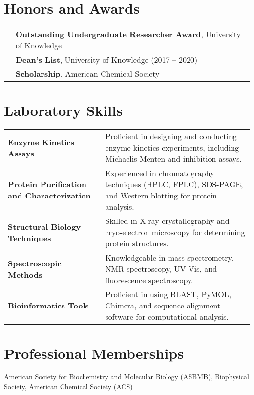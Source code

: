 \documentclass[a4paper,10pt]{article}
\begin{document}
\section*{Honors and Awards}
\begin{tabularx}{\textwidth}{>{\raggedright\arraybackslash}p{1.5cm} X}
2020 & \textbf{Outstanding Undergraduate Researcher Award}, University of Knowledge \\
2019 & \textbf{Dean's List}, University of Knowledge (2017 -- 2020) \\
2018 & \textbf{Scholarship}, American Chemical Society \\
\end{tabularx}

\section*{Laboratory Skills}
\begin{tabularx}{\textwidth}{>{\raggedright\arraybackslash}p{5cm} X}
\textbf{Enzyme Kinetics Assays} & Proficient in designing and conducting enzyme kinetics experiments, including Michaelis-Menten and inhibition assays. \\
\textbf{Protein Purification and Characterization} & Experienced in chromatography techniques (HPLC, FPLC), SDS-PAGE, and Western blotting for protein analysis. \\
\textbf{Structural Biology Techniques} & Skilled in X-ray crystallography and cryo-electron microscopy for determining protein structures. \\
\textbf{Spectroscopic Methods} & Knowledgeable in mass spectrometry, NMR spectroscopy, UV-Vis, and fluorescence spectroscopy. \\

\textbf{Bioinformatics Tools} & Proficient in using BLAST, PyMOL, Chimera, and sequence alignment software for computational analysis. \\
\end{tabularx}

\section*{Professional Memberships}
American Society for Biochemistry and Molecular Biology (ASBMB), Biophysical Society, American Chemical Society (ACS)
\end{document}

